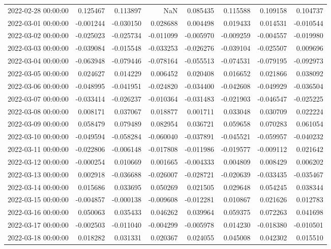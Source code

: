 \begin{tabular}{lrrrrrrr}
2022-02-28 00:00:00 & 0.125467 & 0.113897 & NaN & 0.085435 & 0.115588 & 0.109158 & 0.104737 \\
2022-03-01 00:00:00 & -0.001244 & -0.030150 & 0.028688 & 0.004498 & 0.019433 & 0.014531 & -0.010544 \\
2022-03-02 00:00:00 & -0.025023 & -0.025734 & -0.011099 & -0.005970 & -0.009259 & -0.004557 & -0.019980 \\
2022-03-03 00:00:00 & -0.039084 & -0.015548 & -0.033253 & -0.026276 & -0.039104 & -0.025507 & 0.009696 \\
2022-03-04 00:00:00 & -0.063948 & -0.079446 & -0.078164 & -0.055513 & -0.074531 & -0.079195 & -0.092973 \\
2022-03-05 00:00:00 & 0.024627 & 0.014229 & 0.006452 & 0.020408 & 0.016652 & 0.021866 & 0.038092 \\
2022-03-06 00:00:00 & -0.048995 & -0.041951 & -0.024820 & -0.034400 & -0.042608 & -0.049929 & -0.036504 \\
2022-03-07 00:00:00 & -0.033414 & -0.026237 & -0.010364 & -0.031483 & -0.021903 & -0.046547 & -0.025225 \\
2022-03-08 00:00:00 & 0.008171 & 0.037067 & 0.018877 & 0.001711 & 0.033048 & 0.030709 & 0.022224 \\
2022-03-09 00:00:00 & 0.058479 & 0.079489 & 0.082954 & 0.036721 & 0.059658 & 0.070283 & 0.061054 \\
2022-03-10 00:00:00 & -0.049594 & -0.058284 & -0.060040 & -0.037891 & -0.045521 & -0.059957 & -0.040232 \\
2022-03-11 00:00:00 & -0.022806 & -0.006148 & -0.017808 & -0.011986 & -0.019577 & -0.009112 & 0.021642 \\
2022-03-12 00:00:00 & -0.000254 & 0.010669 & 0.001665 & -0.004333 & 0.004809 & 0.008429 & 0.006202 \\
2022-03-13 00:00:00 & 0.002918 & -0.036688 & -0.026007 & -0.028721 & -0.020639 & -0.033435 & -0.035467 \\
2022-03-14 00:00:00 & 0.015686 & 0.033695 & 0.050269 & 0.021505 & 0.029648 & 0.054245 & 0.038344 \\
2022-03-15 00:00:00 & -0.004857 & -0.000138 & -0.009608 & -0.012281 & 0.010867 & 0.021626 & 0.012783 \\
2022-03-16 00:00:00 & 0.050063 & 0.035433 & 0.046262 & 0.039964 & 0.059375 & 0.072263 & 0.041698 \\
2022-03-17 00:00:00 & -0.002503 & -0.011040 & -0.004299 & -0.005978 & 0.014230 & -0.018380 & -0.010501 \\
2022-03-18 00:00:00 & 0.018282 & 0.031331 & 0.020367 & 0.024055 & 0.045008 & 0.042302 & 0.015510 \\

\end{tabular}
